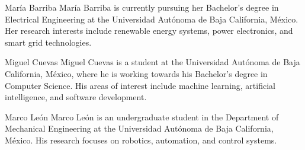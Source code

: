 \documentclass[10pt,journal,compsoc]{IEEEtran}
\begin{document}
\printbibliography

\begin{IEEEbiography}{María Barriba}
    María Barriba is currently pursuing her Bachelor's degree in Electrical Engineering at the Universidad Autónoma de Baja California, México. Her research interests include renewable energy systems, power electronics, and smart grid technologies.
\end{IEEEbiography}

\begin{IEEEbiography}{Miguel Cuevas}
    Miguel Cuevas is a student at the Universidad Autónoma de Baja California, México, where he is working towards his Bachelor's degree in Computer Science. His areas of interest include machine learning, artificial intelligence, and software development.
\end{IEEEbiography}

\begin{IEEEbiography}{Marco León}
    Marco León is an undergraduate student in the Department of Mechanical Engineering at the Universidad Autónoma de Baja California, México. His research focuses on robotics, automation, and control systems.
\end{IEEEbiography}
\end{document}
